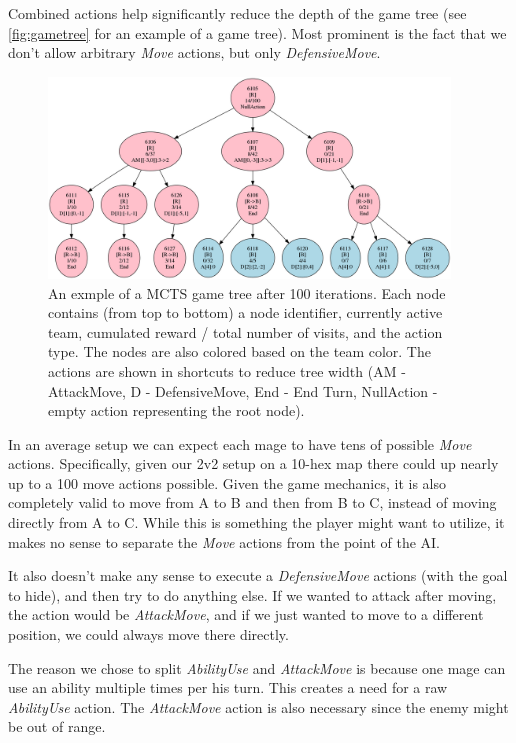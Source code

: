 Combined actions help significantly reduce the depth of the game tree (see \autoref{fig:gametree} for an example of a game tree). Most
prominent is the fact that we don't allow arbitrary \emph{Move} actions, but
only \emph{DefensiveMove}.

\begin{figure}
	\centering
	\includegraphics[width=0.95\textwidth]{img/game-tree.png}
	\caption{An exmple of a MCTS game tree after 100 iterations. Each node
contains (from top to bottom) a node identifier, currently active team,
cumulated reward / total number of visits, and the action type. The nodes are
also colored based on the team color. The actions are shown in shortcuts to
reduce tree width (AM - AttackMove, D - DefensiveMove, End - End Turn,
NullAction - empty action representing the root node).}\label{fig:gametree}
\end{figure}

In an average setup we can expect each mage to have tens of possible
\emph{Move} actions. Specifically, given our 2v2 setup on a 10-hex map there
could up nearly up to a 100 move actions possible. Given the game mechanics, it
is also completely valid to move from A to B and then from B to C, instead of
moving directly from A to C. While this is something the player might want to
utilize, it makes no sense to separate the \emph{Move} actions from the point
of the AI\@.

It also doesn't make any sense to execute a \emph{DefensiveMove} actions (with
the goal to hide), and then try to do anything else. If we wanted to attack
after moving, the action would be \emph{AttackMove}, and if we just wanted to
move to a different position, we could always move there directly.

The reason we chose to split \emph{AbilityUse} and \emph{AttackMove} is because one
mage can use an ability multiple times per his turn. This creates a need for a raw
\emph{AbilityUse} action. The \emph{AttackMove} action is also necessary since the enemy
might be out of range.

